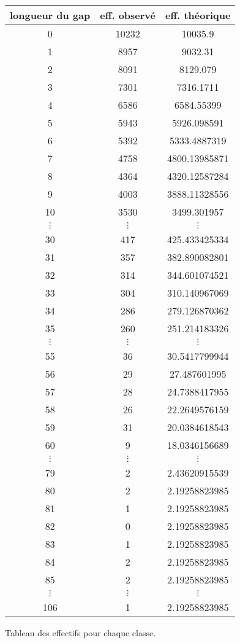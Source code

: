 \documentclass[a4paper,10pt]{article}
\begin{document}
\begin{figure}[H]
\begin{center}
\begin{longtable}{|c|c|c|}
\hline
longueur du gap & eff. observé & eff. théorique \\
\hline
0 & 10232 & 10035.9\\
1 & 8957 & 9032.31\\
2 & 8091 & 8129.079\\
3 & 7301 & 7316.1711\\
4 & 6586 & 6584.55399\\
5 & 5943 & 5926.098591\\
6 & 5392 & 5333.4887319\\
7 & 4758 & 4800.13985871\\
8 & 4364 & 4320.12587284\\
9 & 4003 & 3888.11328556\\
10 & 3530 & 3499.301957\\
$\vdots$ & $\vdots$ & $\vdots$ \\ 
30 & 417 & 425.433425334\\
31 & 357 & 382.890082801\\
32 & 314 & 344.601074521\\
33 & 304 & 310.140967069\\
34 & 286 & 279.126870362\\
35 & 260 & 251.214183326\\
$\vdots$ & $\vdots$ & $\vdots$ \\ 
55 & 36 & 30.5417799944\\
56 & 29 & 27.487601995\\
57 & 28 & 24.7388417955\\
58 & 26 & 22.2649576159\\
59 & 31 & 20.0384618543\\
60 & 9 & 18.0346156689\\
$\vdots$ & $\vdots$ & $\vdots$ \\ 
79 & 2 & 2.43620915539\\
80 & 2 & 2.19258823985\\
81 & 1 & 2.19258823985\\
82 & 0 & 2.19258823985\\
83 & 1 & 2.19258823985\\
84 & 2 & 2.19258823985\\
85 & 2 & 2.19258823985\\
$\vdots$ & $\vdots$ & $\vdots$ \\ 
106 & 1 & 2.19258823985\\
\hline
\end{longtable}
\end{center}
\caption{Tableau des effectifs pour chaque classe.}
\end{figure}
\end{document}
